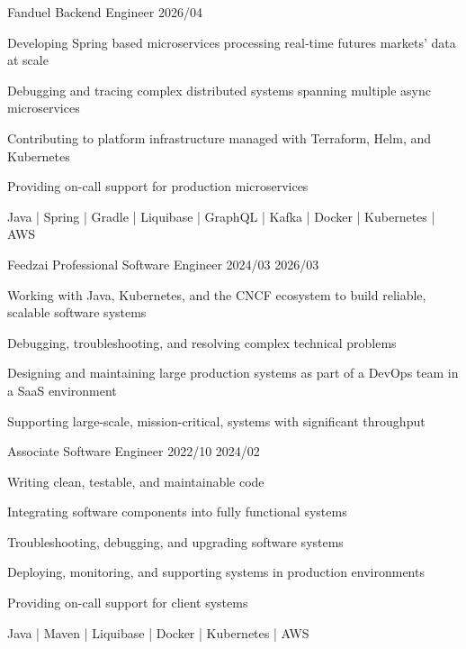 


\begin{cventries}

\cvexperienceentry
  {Fanduel}
  {Backend Engineer}
  {2026/04}
  {}
  {
    \begin{cvitems}
       \item{Developing Spring based microservices processing real‑time futures markets' data at scale}
       \item{Debugging and tracing complex distributed systems spanning multiple async microservices}
       \item{Contributing to platform infrastructure managed with Terraform, Helm, and Kubernetes}
      \item{Providing on-call support for production microservices}
     \end{cvitems}
  }
  {Java | Spring | Gradle | Liquibase | GraphQL | Kafka | Docker | Kubernetes | AWS}

\cvexperienceentry
  {Feedzai}
  {Professional Software Engineer}
  {2024/03}
  {2026/03}
  {
    \begin{cvitems}
      \item{Working with Java, Kubernetes, and the CNCF ecosystem to build reliable, scalable software systems}
      \item{Debugging, troubleshooting, and resolving complex technical problems}
      \item{Designing and maintaining large production systems as part of a DevOps team in a SaaS environment}
      \item{Supporting large-scale, mission-critical, systems with significant throughput}
    \end{cvitems}
  }
  {}

\cvexperienceentry
  {}
  {Associate Software Engineer}
  {2022/10}
  {2024/02}
  {
    \begin{cvitems}
      \item{Writing clean, testable, and maintainable code}
      \item{Integrating software components into fully functional systems}
      \item{Troubleshooting, debugging, and upgrading software systems}
      \item{Deploying, monitoring, and supporting systems in production environments}
      \item{Providing on-call support for client systems}
    \end{cvitems}
  }
  {Java | Maven | Liquibase | Docker | Kubernetes | AWS}


\end{cventries}

